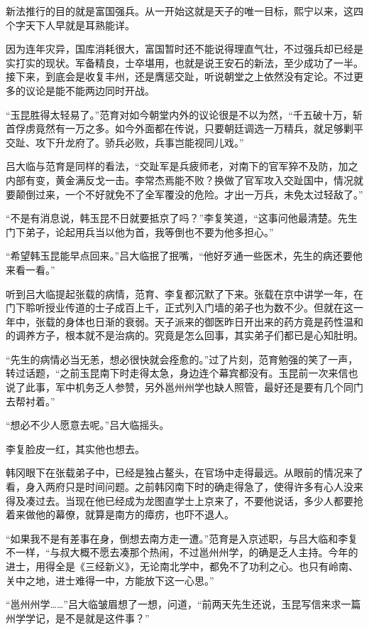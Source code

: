 新法推行的目的就是富国强兵。从一开始这就是天子的唯一目标，熙宁以来，这四个字天下人早就是耳熟能详。

因为连年灾异，国库消耗很大，富国暂时还不能说得理直气壮，不过强兵却已经是实打实的现状。军备精良，士卒堪用，也就是说王安石的新法，至少成功了一半。接下来，到底会是收复丰州，还是膺惩交趾，听说朝堂之上依然没有定论。不过更多的议论是能不能两边同时开战。

“玉昆胜得太轻易了。”范育对如今朝堂内外的议论很是不以为然，“千五破十万，斩首俘虏竟然有一万之多。如今外面都在传说，只要朝廷调选一万精兵，就足够剿平交趾、攻下升龙府了。骄兵必败，兵事岂能视同儿戏。”

吕大临与范育是同样的看法，“交趾军是兵疲师老，对南下的官军猝不及防，加之内部有变，黄金满反戈一击。李常杰焉能不败？换做了官军攻入交趾国中，情况就要颠倒过来，一个不好就免不了全军覆没的危险。才出一万兵，未免太过轻敌了。”

“不是有消息说，韩玉昆不日就要抵京了吗？”李复笑道，“这事问他最清楚。先生门下弟子，论起用兵当以他为首，我等倒也不要为他多担心。”

“希望韩玉昆能早点回来。”吕大临抿了抿嘴，“他好歹通一些医术，先生的病还要他来看一看。”

听到吕大临提起张载的病情，范育、李复都沉默了下来。张载在京中讲学一年，在门下聆听授业传道的士子成百上千，正式列入门墙的弟子也为数不少。但就在这一年中，张载的身体也日渐的衰弱。天子派来的御医昨日开出来的药方竟是药性温和的调养方子，根本就不是治病的。究竟是怎么回事，其实弟子们都已是心知肚明。

“先生的病情必当无恙，想必很快就会痊愈的。”过了片刻，范育勉强的笑了一声，转过话题，“之前玉昆南下时走得太急，身边连个幕宾都没有。玉昆前一次来信也说了此事，军中机务乏人参赞，另外邕州州学也缺人照管，最好还是要有几个同门去帮衬着。”

“想必不少人愿意去呢。”吕大临摇头。

李复脸皮一红，其实他也想去。

韩冈眼下在张载弟子中，已经是独占鳌头，在官场中走得最远。从眼前的情况来了看，身入两府只是时间问题。之前韩冈南下时的确走得急了，使得许多有心人没来得及凑过去。当现在他已经成为龙图直学士上京来了，不要他说话，多少人都要抢着来做他的幕僚，就算是南方的瘴疠，也吓不退人。

“如果我不是有差事在身，倒想去南方走一遭。”范育是入京述职，与吕大临和李复不一样，“与叔大概不愿去凑那个热闹，不过邕州州学，的确是乏人主持。今年的进士，用得全是《三经新义》，无论南北学中，都免不了功利之心。也只有岭南、关中之地，进士难得一中，方能放下这一心思。”

“邕州州学……”吕大临皱眉想了一想，问道，“前两天先生还说，玉昆写信来求一篇州学学记，是不是就是这件事？”

